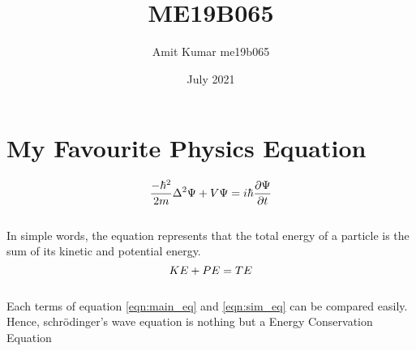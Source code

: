 \documentclass{article}
\title{ME19B065}
\author{Amit Kumar me19b065}
\date{July 2021}
\begin{document}
\maketitle

\section{My Favourite Physics Equation}
\hspace{6mm}
\begin{equation}
\label{eqn:main_eq}
\Large
      \frac{-\hbar^2}{2m}\Delta^2{\Psi} + V\Psi = i\hbar{\frac{\partial \Psi}{\partial t}}
\end{equation}
\\
In simple words, the equation represents that the total energy of a particle is the sum of its kinetic and potential energy. \\
\begin{equation}
\label{eqn:sim_eq}
\Large
    KE+PE=TE
\end{equation}
\\
Each terms of equation \ref{eqn:main_eq} and \ref{eqn:sim_eq} can be compared easily. Hence, schrödinger's wave equation is nothing but a Energy Conservation Equation
\end{document}
